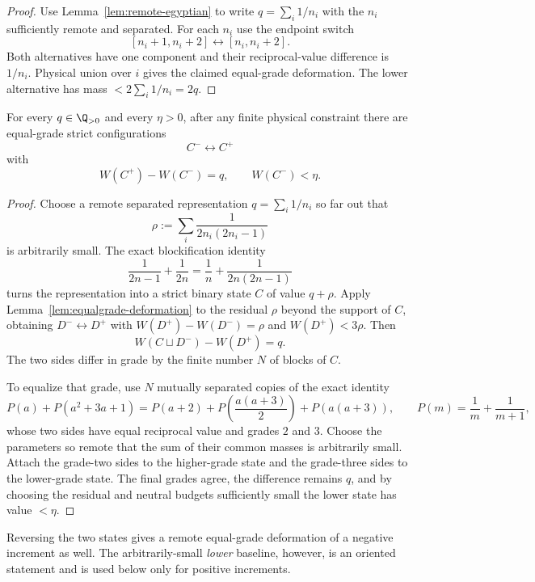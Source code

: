 \begin{proof}
Use Lemma~\ref{lem:remote-egyptian} to write $q=\sum_i1/n_i$ with the
$n_i$ sufficiently remote and separated. For each $n_i$ use the endpoint
switch
\[
[n_i+1,n_i+2]\longleftrightarrow[n_i,n_i+2].
\]
Both alternatives have one component and their reciprocal-value difference
is $1/n_i$. Physical union over $i$ gives the claimed equal-grade deformation.
The lower alternative has mass $<2\sum_i1/n_i=2q$.
\end{proof}

\begin{lemma}\label{lem:light-deformation}
For every $q\in\Q_{>0}$ and every $\eta>0$, after any finite physical
constraint there are equal-grade strict configurations
\[
C^-\leftrightarrow C^+
\]
with
\[
W(C^+)-W(C^-)=q,
\qquad
W(C^-)<\eta.
\]
\end{lemma}

\begin{proof}
Choose a remote separated representation $q=\sum_i1/n_i$ so far out that
\[
\rho:=\sum_i\frac1{2n_i(2n_i-1)}
\]
is arbitrarily small. The exact blockification identity
\[
\frac1{2n-1}+\frac1{2n}
=
\frac1n+\frac1{2n(2n-1)}
\]
turns the representation into a strict binary state $C$ of value $q+\rho$.
Apply Lemma~\ref{lem:equalgrade-deformation} to the residual $\rho$ beyond the
support of $C$, obtaining $D^-\leftrightarrow D^+$ with
$W(D^+)-W(D^-)=\rho$ and $W(D^+)<3\rho$. Then
\[
W(C\sqcup D^-)-W(D^+)=q.
\]
The two sides differ in grade by the finite number $N$ of blocks of $C$.

To equalize that grade, use $N$ mutually separated copies of the exact
identity
\[
P(a)+P(a^2+3a+1)
=
P(a+2)+P\!\left(\frac{a(a+3)}2\right)+P(a(a+3)),
\qquad
P(m)=\frac1m+\frac1{m+1},
\]
whose two sides have equal reciprocal value and grades $2$ and $3$. Choose the
parameters so remote that the sum of their common masses is arbitrarily small.
Attach the grade-two sides to the higher-grade state and the grade-three sides
to the lower-grade state. The final grades agree, the difference remains $q$,
and by choosing the residual and neutral budgets sufficiently small the lower
state has value $<\eta$.
\end{proof}

Reversing the two states gives a remote equal-grade deformation of a negative
increment as well.  The arbitrarily-small \emph{lower} baseline, however, is
an oriented statement and is used below only for positive increments.

